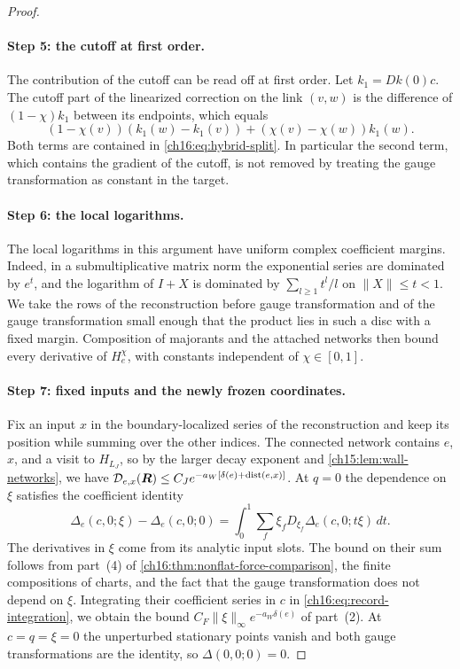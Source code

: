 \begin{proof}
\paragraph{Step 5: the cutoff at first order.}
The contribution of the cutoff can be read off at first order. Let $k_1=Dk(0)c$. The cutoff part of the linearized correction on the link $(v,w)$ is the difference of $(1-\chi)k_1$ between its endpoints, which equals
\[
 (1-\chi(v))(k_1(w)-k_1(v))
                         +(\chi(v)-\chi(w))k_1(w).
\]
Both terms are contained in \eqref{ch16:eq:hybrid-split}. In particular the second term, which contains the gradient of the cutoff, is not removed by treating the gauge transformation as constant in the target.

\paragraph{Step 6: the local logarithms.}
The local logarithms in this argument have uniform complex coefficient margins. Indeed, in a submultiplicative matrix norm the exponential series are dominated by $e^t$, and the logarithm of $I+X$ is dominated by $\sum_{l\ge1}t^l/l$ on $\|X\|\le t<1$. We take the rows of the reconstruction before gauge transformation and of the gauge transformation small enough that the product lies in such a disc with a fixed margin. Composition of majorants and the attached networks then bound every derivative of $H_e^\chi$, with constants independent of $\chi\in[0,1]$.

\paragraph{Step 7: fixed inputs and the newly frozen coordinates.}
Fix an input $x$ in the boundary-localized series of the reconstruction and keep its position while summing over the other indices. The connected network contains $e$, $x$, and a visit to $H_{L_J}$, so by the larger decay exponent and \cref{ch15:lem:wall-networks}, we have $\mathcal D_{e,x}(\boldsymbol R)\le C_Je^{-a_W[\delta(e)+\operatorname{dist}(e,x)]}$. At $q=0$ the dependence on $\xi$ satisfies the coefficient identity
\begin{equation}\label{ch16:eq:record-integration}
 \Delta_e(c,0;\xi)-\Delta_e(c,0;0)
  =\int_0^1\sum_f\xi_fD_{\xi_f}\Delta_e(c,0;t\xi)\,dt.
\end{equation}
The derivatives in $\xi$ come from its analytic input slots. The bound on their sum follows from part~(4) of \cref{ch16:thm:nonflat-force-comparison}, the finite compositions of charts, and the fact that the gauge transformation does not depend on $\xi$. Integrating their coefficient series in $c$ in \eqref{ch16:eq:record-integration}, we obtain the bound $C_F\|\xi\|_\infty e^{-a_W\delta(e)}$ of part~(2). At $c=q=\xi=0$ the unperturbed stationary points vanish and both gauge transformations are the identity, so $\Delta(0,0;0)=0$.


\end{proof}
